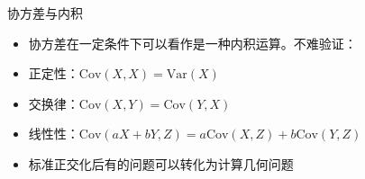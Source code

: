 \documentclass{beamer}
\newcommand{\var}{\text{Var}}
\newcommand{\cov}{\text{Cov}}
\begin{document}
    \begin{frame}{协方差与内积}
        \begin{itemize}
            \setlength{\itemsep}{10pt}
            \item 协方差在一定条件下可以看作是一种内积运算。不难验证：
            \item 正定性：$\cov(X,X)=\var(X)$
            \item 交换律：$\cov(X,Y)=\cov(Y,X)$
            \item 线性性：$\cov(aX+bY,Z)=a\cov(X,Z)+b\cov(Y,Z)$
            \item 标准正交化后有的问题可以转化为计算几何问题
        \end{itemize}
    \end{frame}
\end{document}
